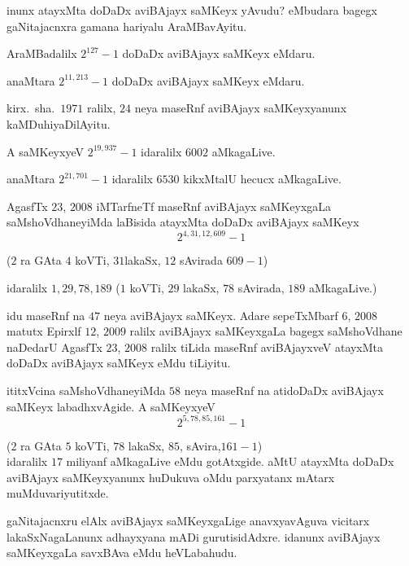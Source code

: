 inunx atayxMta doDaDx aviBAjayx saMKeyx yAvudu? eMbudara bagegx gaNitajacnxra gamana hariyalu AraMBavAyitu.

AraMBadalilx $2^{127}-1$ doDaDx aviBAjayx saMKeyx eMdaru.

anaMtara $2^{11,213}-1$ doDaDx aviBAjayx saMKeyx eMdaru.

kirx.~sha.\ $1971$ ralilx, $24$ neya maseRnf aviBAjayx saMKeyxyanunx kaMDuhiyaDilAyitu.

A saMKeyxyeV $2^{19,937}-1$ idaralilx $6002$ aMkagaLive.

anaMtara $2^{21,701}-1$ idaralilx $6530$ kikxMtalU hecucx aMkagaLive.

AgasfTx $23$, $2008$ iMTarfneTf maseRnf aviBAjayx saMKeyxgaLa \-saMshoVdhaneyiMda laBisida atayxMta doDaDx aviBAjayx saMKeyx
$$ 
2^{4,31,12,609}-1
$$

($2$ ra GAta $4$ koVTi, $31$lakaSx, $12$ sAvirada $609-1$)

idaralilx $1,29,78,189$ ($1$ koVTi, $29$ lakaSx, $78$ sAvirada, $189$ aMkagaLive.)

idu maseRnf na $47$ neya aviBAjayx saMKeyx. Adare sepeTxMbarf $6$, $2008$ matutx Epirxlf $12$, $2009$ ralilx aviBAjayx saMKeyxgaLa bagegx saMshoVdhane naDedarU AgasfTx $23$, $2008$ ralilx tiLida maseRnf aviBAjayxveV atayxMta doDaDx aviBAjayx saMKeyx eMdu tiLiyitu. 

ititxVcina saMshoVdhaneyiMda $58$ neya maseRnf na atidoDaDx aviBAjayx saMKeyx labadhxvAgide. A saMKeyxyeV 
$$
2^{5,78,85,161}-1
$$

($2$ ra GAta $5$ koVTi, $78$ lakaSx, $85$, sAvira,$161 - 1$)\\
idaralilx $17$ miliyanf aMkagaLive eMdu gotAtxgide. aMtU atayxMta doDaDx aviBAjayx saMKeyxyanunx huDukuva oMdu parxyatanx mAtarx muMduvariyutitxde.

gaNitajacnxru elAlx aviBAjayx saMKeyxgaLige anavxyavAguva vicitarx lakaSxNagaLanunx adhayxyana mADi gurutisidAdxre. idanunx aviBAjayx saMKeyxgaLa savxBAva eMdu heVLa\-bahudu.

